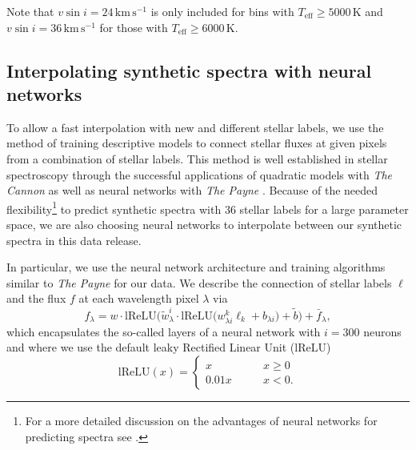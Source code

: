 \documentclass[
  journal=pasa,
  manuscript=research-paper, %
  year=2023,
  volume=37
]{cup-journal}
\newcommand{\Teff}{$T_\mathrm{eff}$\xspace}
\newcommand{\vsini}{$v \sin i$\xspace}
\newcommand{\kms}{\,\mathrm{km\,s^{-1}}}	%
\begin{document}
Note that $v \sin i = 24 \kms$ is only included for bins with \Teff$\geq 5000\,\mathrm{K}$ and $v \sin i = 36 \kms$ for those with \Teff$\geq 6000\,\mathrm{K}$.


\subsection{Interpolating synthetic spectra with neural networks} \label{sec:interpolating_synthetic_spectra_with_neural_networks}

To allow a fast interpolation with new and different stellar labels, we use the method of training descriptive models to connect stellar fluxes at given pixels from a combination of stellar labels. This method is well established in stellar spectroscopy through the successful applications of quadratic models with \textit{The Cannon} \citep[see e.g.][]{Ness2015, Ness2016, Casey2016, Casey2017, Ho2017, Buder2018} as well as neural networks with \textit{The Payne} \citep[see e.g.][]{Ting2019, Xiang2019, Xiang2021}. Because of the needed flexibility\footnote{For a more detailed discussion on the advantages of neural networks for predicting spectra see \citet{Ting2019}.} to predict synthetic spectra with 36 stellar labels for a large parameter space, we are also choosing neural networks to interpolate between our synthetic spectra in this data release.

In particular, we use the neural network architecture and training algorithms similar to \textit{The Payne} \citep{Ting2019} for our data. We describe the connection of stellar labels $\boldsymbol{\ell}$ and the flux $f$ at each wavelength pixel $\lambda$ via
\begin{equation}
f_\lambda = w \cdot \mathrm{lReLU} \bigg( \tilde{w}_\lambda^i \cdot \mathrm{lReLU}  \Big( w^k_{\lambda i} \ell_k + b_{\lambda i} \Big) + \tilde{b} \bigg) + \bar{f}_\lambda,
\label{eq:neural_network_function}
\end{equation}
which encapsulates the so-called layers of a neural network with $i = 300$ neurons and where we use the default leaky Rectified Linear Unit ($\mathrm{lReLU}$)
\begin{equation}
    \mathrm{lReLU} (x) =  \begin{cases}
        x \qquad &x \geq 0 \\
        0.01 x \qquad &x < 0.
    \end{cases}
\end{equation}
\end{document}
